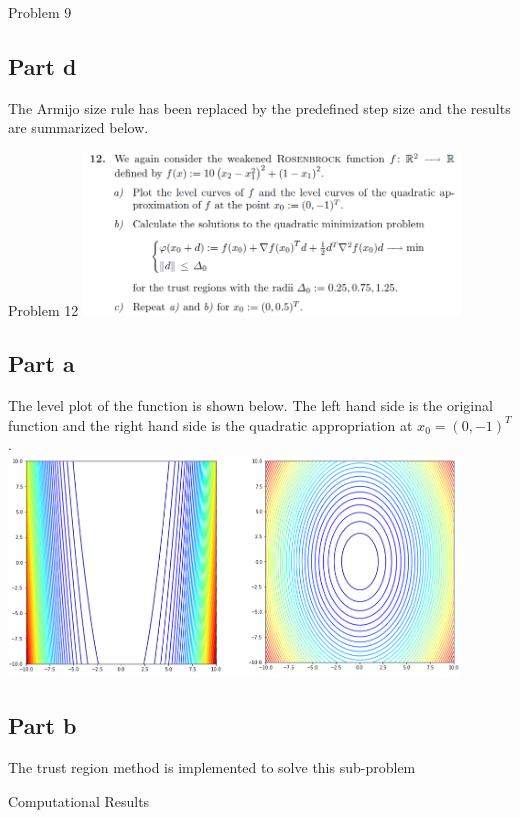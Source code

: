 \documentclass[10pt]{article}
\begin{document}
\begin{section}{Problem 9}
\subsection{Part d}
The Armijo size rule has been replaced by the predefined step size and the results are summarized below. \\

\end{section}

\begin{section}{Problem 12}
\includegraphics[width=10cm]{img/problem12.png}

\subsection{Part a}
The level plot of the function is shown below. The left hand side is the original function and the right hand side is the quadratic appropriation at $x_0 = (0, -1)^T$. \\

\includegraphics[width=12cm]{img/problem12_plt1.png}


\subsection{Part b}
The trust region method is implemented to solve this sub-problem


Computational Results 



\end{section}
\end{document}
